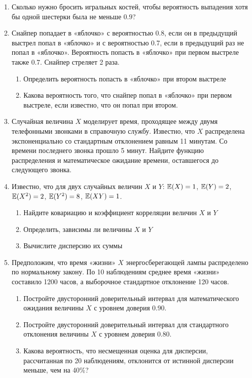 \documentclass[12pt, a4paper]{article}\usepackage[]{graphicx}\usepackage[]{color}
\begin{document}
\begin{enumerate}

\item Сколько нужно бросить игральных костей, чтобы вероятность выпадения хотя бы одной шестерки была не меньше $0.9$?
\item Снайпер попадает в «яблочко» с вероятностью 0.8, если он в предыдущий выстрел попал в «яблочко» и с вероятностью 0.7, если в предыдущий раз не попал в  «яблочко». Вероятность попасть в «яблочко» при первом выстреле также 0.7. Снайпер стреляет 2 раза.
\begin{enumerate}
\item Определить вероятность попасть в «яблочко» при втором выстреле
\item Какова вероятность того, что снайпер попал в «яблочко» при первом выстреле, если известно, что он попал при втором.
\end{enumerate}
\item Случайная величина $X$ моделирует время, проходящее между двумя телефонными звонками в справочную службу. Известно, что $X$ распределена экспоненциально со стандартным отклонением равным 11 минутам. Со времени последнего звонка прошло 5 минут. Найдите функцию распределения и математическое ожидание времени, оставшегося до следующего звонка.
\item Известно, что для двух случайных величин $X$ и $Y$: $\mathbb{E}(X)=1$, $\mathbb{E}(Y)=2$, $\mathbb{E}(X^2)=2$, $\mathbb{E}(Y^2)=8$, $\mathbb{E}(XY)=1$.
\begin{enumerate}
\item Найдите ковариацию и коэффициент корреляции величин $X$ и $Y$
\item Определить, зависимы ли величины $X$ и $Y$
\item Вычислите дисперсию их суммы
\end{enumerate}
\item Предположим, что время «жизни» $X$ энергосберегающей лампы распределено по нормальному закону. По 10 наблюдениям среднее время «жизни» составило 1200 часов, а выборочное стандартное отклонение 120 часов.
\begin{enumerate}
\item Постройте двусторонний доверительный интервал для математического ожидания величины $X$ с уровнем доверия 0.90.
\item Постройте двусторонний доверительный интервал для стандартного отклонения величины $X$ с уровнем доверия 0.80.
\item Какова вероятность, что несмещенная оценка для дисперсии, рассчитанная по 20 наблюдениям, отклонится от истинной дисперсии меньше, чем на 40\%?

\end{enumerate}
\end{enumerate}
\end{document}
